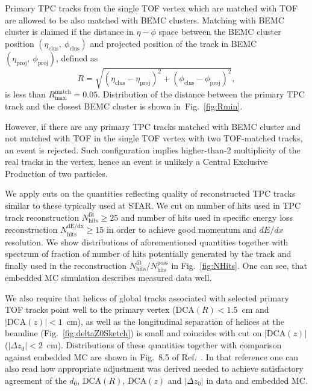 Primary TPC tracks from the single TOF vertex which are matched with TOF are allowed to be also matched with BEMC clusters. Matching with BEMC cluster is claimed if the distance in $\eta-\phi$ space between the BEMC cluster position $(\eta_{\text{clus}},~\phi_{\text{clus}})$ and projected position of the track in BEMC $(\eta_{\text{proj}},~\phi_{\text{proj}})$, defined as
\begin{equation}\label{eq:etaPhiR}
 R=\sqrt{(\eta_{\text{clus}}-\eta_{\text{proj}})^{2} + (\phi_{\text{clus}}-\phi_{\text{proj}})^{2}},
\end{equation}
is less than $R^{\text{match}}_{\text{max}} = 0.05$. Distribution of the distance between the primary TPC track and the closest BEMC cluster is shown in~Fig.~\ref{fig:Rmin}.

However, if there are any primary TPC tracks matched with BEMC cluster and not matched with TOF in the single TOF vertex with two TOF-matched tracks, an event is rejected. Such configuration implies higher-than-2 multiplicity of the real tracks in the vertex, hence an event is unlikely a Central Exclusive Production of two particles.

We apply cuts on the quantities reflecting quality of reconstructed TPC tracks similar to these typically used at STAR. We cut on number of hits used in TPC track reconstruction $N_{\text{hits}}^{\text{fit}} \geq 25$ and number of hits used in specific energy loss reconstruction $N_{\text{hits}}^{\text{dE/dx}} \geq 15$ in order to achieve good momentum and $dE/dx$ resolution. We show distributions of aforementioned quantities together with spectrum of fraction of number of hits potentially generated by the track and finally used in the reconstruction $N_{\text{hits}}^{\text{fit}}/N_{\text{hits}}^{\text{poss}}$ in Fig.~\ref{fig:NHits}. One can see, that embedded MC simulation describes measured data well.

We also require that helices of global tracks associated with selected primary TOF tracks point well to the primary vertex ($\text{DCA}(R)<1.5$~cm and $|\text{DCA}(z)|<1$~cm), as well as the longitudinal separation of helices at the beamline (Fig.~\ref{fig:deltaZ0Sketch}) is small and coincides with cut on $|\text{DCA}(z)|$ ($|\Delta z_{0}|<2$~cm). Distributions of these quantities together with comparison against embedded MC are shown in Fig.~8.5 of Ref.~\cite{supplementaryNote}. In that reference one can also read how appropriate adjustment was derived needed to achieve satisfactory agreement of the $d_{0}$, $\text{DCA}(R)$, $\text{DCA}(z)$ and $|\Delta z_{0}|$ in data and embedded MC.

